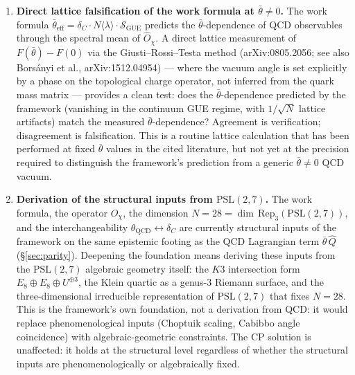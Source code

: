 \documentclass[11pt,a4paper]{article}
\newcommand{\dC}{\delta_C}
\newcommand{\PSL}{\mathrm{PSL}}
\newcommand{\Opchi}{\hat{O}_\chi}
\theoremstyle{plain}
\theoremstyle{definition}
\theoremstyle{remark}
\begin{document}
\begin{enumerate}[leftmargin=2em,itemsep=2pt]
  \item \textbf{Direct lattice falsification of the work formula at
        $\bar\theta \neq 0$.}  The work formula
        $\bar\theta_{\mathrm{eff}} = \dC \cdot N\langle\lambda\rangle
        \cdot \mathcal{S}_{\mathrm{GUE}}$ predicts the
        $\bar\theta$-dependence of QCD observables through the
        spectral mean of $\Opchi$.  A direct lattice measurement of
        $F(\bar\theta) - F(0)$ via the Giusti--Rossi--Testa method
        (arXiv:0805.2056; see also Bors\'anyi et al., arXiv:1512.04954)
        --- where the vacuum angle is set explicitly by a phase on
        the topological charge operator, not inferred from the
        quark mass matrix --- provides a clean test: does the
        $\bar\theta$-dependence predicted by the framework
        (vanishing in the continuum GUE regime, with $1/\sqrt{N}$
        lattice artifacts) match the measured
        $\bar\theta$-dependence?  Agreement is verification;
        disagreement is falsification.  This is a routine lattice
        calculation that has been performed at fixed $\bar\theta$
        values in the cited literature, but not yet at the
        precision required to distinguish the framework's
        prediction from a generic $\bar\theta \neq 0$ QCD vacuum.

  \item \textbf{Derivation of the structural inputs from
        $\PSL(2,7)$.}  The work formula, the operator $\Opchi$,
        the dimension $N = 28 = \dim\,\mathrm{Rep}_3(\PSL(2,7))$,
        and the interchangeability $\theta_{\mathrm{QCD}}
        \leftrightarrow \dC$ are currently structural inputs of the
        framework on the same epistemic footing as the QCD
        Lagrangian term $\bar\theta\,\hat Q$ (\S\ref{sec:parity}).
        Deepening the foundation means deriving these inputs from
        the $\PSL(2,7)$ algebraic geometry itself: the $K3$
        intersection form $E_8 \oplus E_8 \oplus U^{\oplus 3}$, the
        Klein quartic as a genus-3 Riemann surface, and the
        three-dimensional irreducible representation of $\PSL(2,7)$
        that fixes $N = 28$.  This is the framework's own
        foundation, not a derivation from QCD: it would replace
        phenomenological inputs (Choptuik scaling, Cabibbo angle
        coincidence) with algebraic-geometric constraints.  The
        CP solution is unaffected: it holds at the structural level
        regardless of whether the structural inputs are
        phenomenologically or algebraically fixed.
\end{enumerate}
\end{document}
